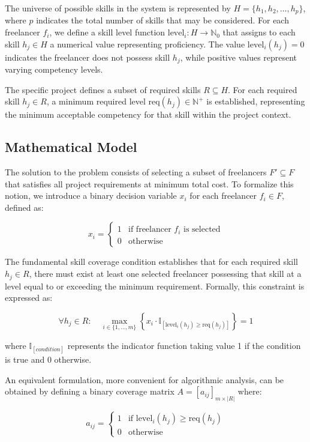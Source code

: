 \documentclass[12pt,a4paper]{article}
\begin{document}
The universe of possible skills in the system is represented by $H = \{h_1, h_2, \ldots, h_p\}$, where $p$ indicates the total number of skills that may be considered. For each freelancer $f_i$, we define a skill level function $\text{level}_i: H \rightarrow \mathbb{N}_0$ that assigns to each skill $h_j \in H$ a numerical value representing proficiency. The value $\text{level}_i(h_j) = 0$ indicates the freelancer does not possess skill $h_j$, while positive values represent varying competency levels.

The specific project defines a subset of required skills $R \subseteq H$. For each required skill $h_j \in R$, a minimum required level $\text{req}(h_j) \in \mathbb{N}^+$ is established, representing the minimum acceptable competency for that skill within the project context.

\subsection{Mathematical Model}
\label{subsec:model}

The solution to the problem consists of selecting a subset of freelancers $F' \subseteq F$ that satisfies all project requirements at minimum total cost. To formalize this notion, we introduce a binary decision variable $x_i$ for each freelancer $f_i \in F$, defined as:

\[
x_i = 
\begin{cases} 
	1 & \text{if freelancer } f_i \text{ is selected} \\
	0 & \text{otherwise}
\end{cases}
\]

The fundamental skill coverage condition establishes that for each required skill $h_j \in R$, there must exist at least one selected freelancer possessing that skill at a level equal to or exceeding the minimum requirement. Formally, this constraint is expressed as:

\[
\forall h_j \in R: \quad \max_{i \in \{1,\ldots,m\}} \left\{ x_i \cdot \mathbb{I}_{[\text{level}_i(h_j) \geq \text{req}(h_j)]} \right\} = 1
\]

where $\mathbb{I}_{[condition]}$ represents the indicator function taking value 1 if the condition is true and 0 otherwise.

An equivalent formulation, more convenient for algorithmic analysis, can be obtained by defining a binary coverage matrix $A = [a_{ij}]_{m \times |R|}$ where:

\[
a_{ij} = 
\begin{cases} 
	1 & \text{if } \text{level}_i(h_j) \geq \text{req}(h_j) \\
	0 & \text{otherwise}
\end{cases}
\]
\end{document}
